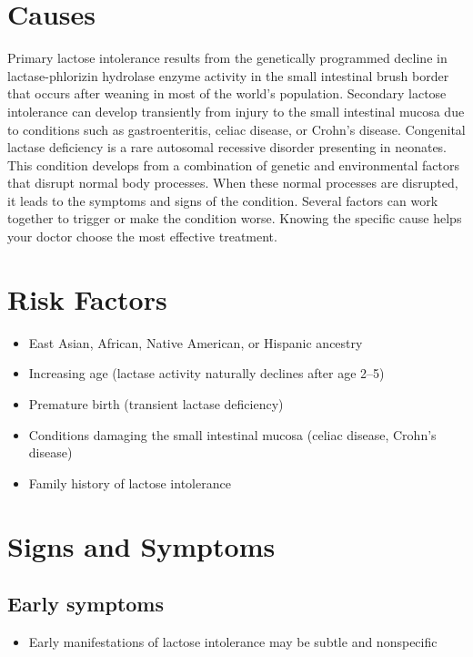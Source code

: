 \section{Causes}
Primary lactose intolerance results from the genetically programmed decline in lactase-phlorizin hydrolase enzyme activity in the small intestinal brush border that occurs after weaning in most of the world's population. Secondary lactose intolerance can develop transiently from injury to the small intestinal mucosa due to conditions such as gastroenteritis, celiac disease, or Crohn's disease. Congenital lactase deficiency is a rare autosomal recessive disorder presenting in neonates. This condition develops from a combination of genetic and environmental factors that disrupt normal body processes. When these normal processes are disrupted, it leads to the symptoms and signs of the condition. Several factors can work together to trigger or make the condition worse. Knowing the specific cause helps your doctor choose the most effective treatment.

\section{Risk Factors}

\begin{itemize}[noitemsep]
  \item East Asian, African, Native American, or Hispanic ancestry
  \item Increasing age (lactase activity naturally declines after age 2--5)
  \item Premature birth (transient lactase deficiency)
  \item Conditions damaging the small intestinal mucosa (celiac disease, Crohn's disease)
  \item Family history of lactose intolerance
\end{itemize}

\section{Signs and Symptoms}

\subsection{Early symptoms}
\begin{itemize}[noitemsep]
  \item Early manifestations of lactose intolerance may be subtle and nonspecific
\end{itemize}

